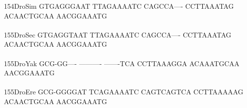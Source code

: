\documentclass[11pt,twoside,reqno,a4paper]{article}
\begin{document}
{154\hspace*{1\charwidth}DroSim	GTGAGGGAAT	TTAGAAAATC	CAGCCA----	CCTTAAATAG	ACAACTGCAA	AACGGAAATG	\\
\hspace*{4\charwidth}\hspace*{7\charwidth}\hspace*{1\charwidth}\hspace*{1\charwidth}\hspace*{1\charwidth}\hspace*{1\charwidth}\hspace*{1\charwidth}\hspace*{1\charwidth}\\
155\hspace*{1\charwidth}DroSec	GTGAGGTAAT	TTAGAAAATC	CAGCCA----	CCTTAAATAG	ACAACTGCAA	AACGGAAATG	\\
\hspace*{4\charwidth}\hspace*{7\charwidth}\hspace*{1\charwidth}\hspace*{1\charwidth}\hspace*{1\charwidth}\hspace*{1\charwidth}\hspace*{1\charwidth}\hspace*{1\charwidth}\\
155\hspace*{1\charwidth}DroYak	GCG-GG----	----------	-------TCA	CCTTAAAGGA	ACAAATGCAA	AACGGAAATG	\\
\hspace*{4\charwidth}\hspace*{7\charwidth}\hspace*{1\charwidth}\hspace*{1\charwidth}\hspace*{1\charwidth}\hspace*{1\charwidth}\hspace*{1\charwidth}\hspace*{1\charwidth}\\
155\hspace*{1\charwidth}DroEre	GCG-GGGGAT	TCAGAAAATC	CAGTCAGTCA	CCTTAAAAAG	ACAACTGCAA	AACGGAAATG	\\
\hspace*{4\charwidth}\hspace*{7\charwidth}\hspace*{1\charwidth}\hspace*{1\charwidth}\hspace*{1\charwidth}\hspace*{1\charwidth}\hspace*{1\charwidth}\hspace*{1\charwidth}\\
}
\end{document}
